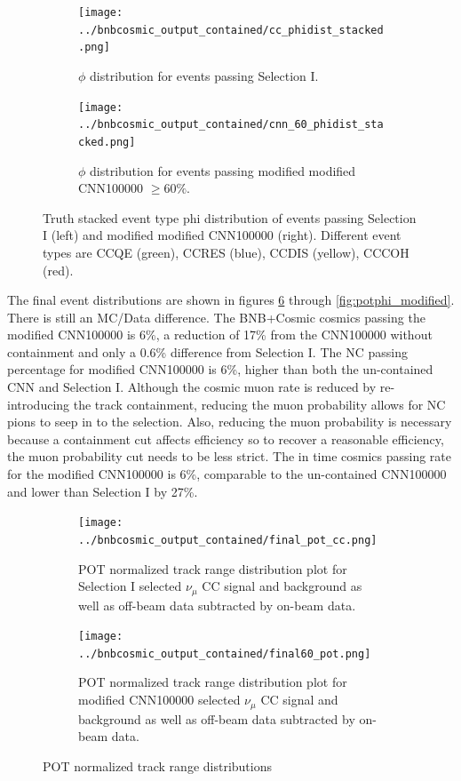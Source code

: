 \begin{figure}[htp!]
\centering
	\begin{subfigure}[b]{.475\textwidth}
	\centering
		\texttt{[image: ../bnbcosmic\_output\_contained/cc\_phidist\_stacked.png]}
		\caption{$\phi$ distribution for events passing Selection I.} 
		\label{fig:ccphistacked_modified}
	\end{subfigure}
	\quad
	\begin{subfigure}[b]{.475\textwidth}
	\centering
		\texttt{[image: ../bnbcosmic\_output\_contained/cnn\_60\_phidist\_stacked.png]}
		\caption{$\phi$ distribution for events passing modified modified CNN100000 $\geq 60\%$.} 
		\label{fig:cnn60phistacked_modified}
	\end{subfigure}
\caption{Truth stacked event type phi distribution of events passing Selection I (left) and modified modified CNN100000 (right). Different event types are CCQE (green), CCRES (blue), CCDIS (yellow), CCCOH (red).}
\label{fig:phistacked_modified}
\end{figure}


The final event distributions are shown in figures \ref{fig:pottrack_modified} through \ref{fig:potphi_modified}. There is still an MC/Data difference. The BNB+Cosmic cosmics passing the modified CNN100000 is 6\%, a reduction of 17\% from the CNN100000 without containment and only a 0.6\% difference from Selection I. The NC passing percentage for modified CNN100000 is 6\%, higher than both the un-contained CNN and Selection I. Although the cosmic muon rate is reduced by re-introducing the track containment, reducing the muon probability allows for NC pions to seep in to the selection. Also, reducing the muon probability is necessary because a containment cut affects efficiency so to recover a reasonable efficiency, the muon probability cut needs to be less strict. The in time cosmics passing rate for the modified CNN100000 is 6\%, comparable to the un-contained CNN100000 and lower than Selection I by 27\%. 
\begin{figure}[htp!]
\centering
	\begin{subfigure}[t]{.475\textwidth}
		\texttt{[image: ../bnbcosmic\_output\_contained/final\_pot\_cc.png]}
		\caption{POT normalized track range distribution plot for Selection I selected $\nu_{\mu}$ CC signal and background as well as off-beam data subtracted by on-beam data.} 
		\label{fig:ccpottrack_modified}
	\end{subfigure}
	\begin{subfigure}[t]{.475\textwidth}
	\centering
		\texttt{[image: ../bnbcosmic\_output\_contained/final60\_pot.png]}
		\caption{POT normalized track range distribution plot for modified CNN100000 selected $\nu_{\mu}$ CC signal and background as well as off-beam data subtracted by on-beam data.} 
	\label{fig:cnnpottrack_modified}
	\end{subfigure}
\caption{POT normalized track range distributions}
\label{fig:pottrack_modified}
\end{figure}

